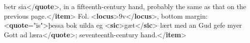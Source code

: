 \begin{shaded}
\hspace*{1em}\hspace*{1em}\hspace*{1em}\hspace*{1em}\hspace*{1em}\hspace*{1em}\hspace*{1em}\hspace*{1em} betr sia{</\textbf{quote}>}, in a fifteenth-century hand, probably the same as that on the\mbox{}\newline 
\hspace*{1em}\hspace*{1em}\hspace*{1em}\hspace*{1em}\hspace*{1em}\hspace*{1em} previous page.{</\textbf{item}>}\mbox{}\newline 
\hspace*{1em}\hspace*{1em}Fol. {<\textbf{locus}>}9v{</\textbf{locus}>}, bottom margin: {<\textbf{quote}\hspace*{1em}{xml:lang}="{is}">}þessa bok\mbox{}\newline 
\hspace*{1em}\hspace*{1em}\hspace*{1em}\hspace*{1em}\hspace*{1em}\hspace*{1em}\hspace*{1em}\hspace*{1em} uilda eg {<\textbf{sic}>}gæt{</\textbf{sic}>} lært med\mbox{}\newline 
\hspace*{1em}\hspace*{1em}\hspace*{1em}an Gud gefe myer Gott ad\mbox{}\newline 
\hspace*{1em}\hspace*{1em}\hspace*{1em}læra{</\textbf{quote}>}; seventeenth-century hand.{</\textbf{item}>}\mbox{}\newline 
\hspace*{1em}\mbox{}\newline 

\end{shaded}
